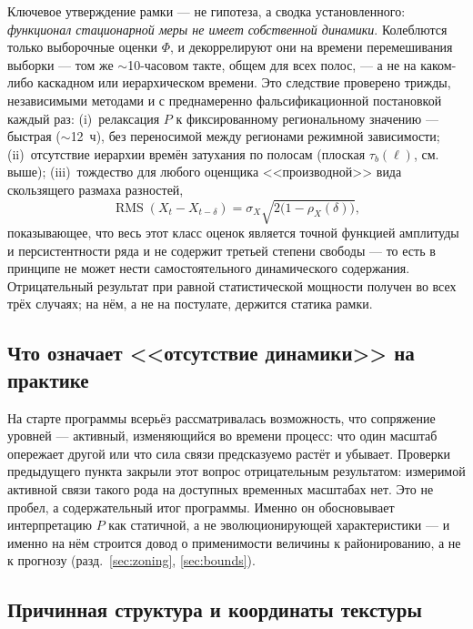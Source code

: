 \documentclass[11pt,a4paper]{article}
\begin{document}
Ключевое утверждение рамки --- не гипотеза, а сводка установленного: \emph{функционал стационарной меры не имеет собственной динамики}. Колеблются только выборочные оценки $\Phi$, и декоррелируют они на времени перемешивания выборки --- том же $\sim$10-часовом такте, общем для всех полос, --- а не на каком-либо каскадном или иерархическом времени. Это следствие проверено трижды, независимыми методами и с преднамеренно фальсификационной постановкой каждый раз: (i)~релаксация $P$ к фиксированному региональному значению --- быстрая ($\sim$12~ч), без переносимой между регионами режимной зависимости; (ii)~отсутствие иерархии времён затухания по полосам (плоская $\tau_b(\ell)$, см. выше); (iii)~тождество для любого оценщика <<производной>> вида скользящего размаха разностей,
\begin{equation}
\operatorname{RMS}\!\left(X_t-X_{t-\delta}\right)=\sigma_X\sqrt{2\bigl(1-\rho_X(\delta)\bigr)},
\label{eq:rms}
\end{equation}
показывающее, что весь этот класс оценок является точной функцией амплитуды и персистентности ряда и не содержит третьей степени свободы --- то есть в принципе не может нести самостоятельного динамического содержания. Отрицательный результат при равной статистической мощности получен во всех трёх случаях; на нём, а не на постулате, держится статика рамки.

\subsection{Что означает <<отсутствие динамики>> на практике}
\label{sec:nodyn}

На старте программы всерьёз рассматривалась возможность, что сопряжение уровней --- активный, изменяющийся во времени процесс: что один масштаб опережает другой или что сила связи предсказуемо растёт и убывает. Проверки предыдущего пункта закрыли этот вопрос отрицательным результатом: измеримой активной связи такого рода на доступных временных масштабах нет. Это не пробел, а содержательный итог программы. Именно он обосновывает интерпретацию $P$ как статичной, а не эволюционирующей характеристики --- и именно на нём строится довод о применимости величины к районированию, а не к прогнозу (разд.~\ref{sec:zoning}, \ref{sec:bounds}).

\subsection{Причинная структура и координаты текстуры}
\label{sec:tiers}
\end{document}
